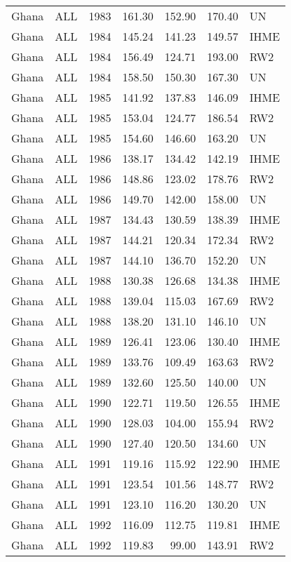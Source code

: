 \begin{longtable}{lllrrrl}
  Ghana & ALL & 1983 & 161.30 & 152.90 & 170.40 & UN \\ 
  Ghana & ALL & 1984 & 145.24 & 141.23 & 149.57 & IHME \\ 
  Ghana & ALL & 1984 & 156.49 & 124.71 & 193.00 & RW2 \\ 
  Ghana & ALL & 1984 & 158.50 & 150.30 & 167.30 & UN \\ 
  Ghana & ALL & 1985 & 141.92 & 137.83 & 146.09 & IHME \\ 
  Ghana & ALL & 1985 & 153.04 & 124.77 & 186.54 & RW2 \\ 
  Ghana & ALL & 1985 & 154.60 & 146.60 & 163.20 & UN \\ 
  Ghana & ALL & 1986 & 138.17 & 134.42 & 142.19 & IHME \\ 
  Ghana & ALL & 1986 & 148.86 & 123.02 & 178.76 & RW2 \\ 
  Ghana & ALL & 1986 & 149.70 & 142.00 & 158.00 & UN \\ 
  Ghana & ALL & 1987 & 134.43 & 130.59 & 138.39 & IHME \\ 
  Ghana & ALL & 1987 & 144.21 & 120.34 & 172.34 & RW2 \\ 
  Ghana & ALL & 1987 & 144.10 & 136.70 & 152.20 & UN \\ 
  Ghana & ALL & 1988 & 130.38 & 126.68 & 134.38 & IHME \\ 
  Ghana & ALL & 1988 & 139.04 & 115.03 & 167.69 & RW2 \\ 
  Ghana & ALL & 1988 & 138.20 & 131.10 & 146.10 & UN \\ 
  Ghana & ALL & 1989 & 126.41 & 123.06 & 130.40 & IHME \\ 
  Ghana & ALL & 1989 & 133.76 & 109.49 & 163.63 & RW2 \\ 
  Ghana & ALL & 1989 & 132.60 & 125.50 & 140.00 & UN \\ 
  Ghana & ALL & 1990 & 122.71 & 119.50 & 126.55 & IHME \\ 
  Ghana & ALL & 1990 & 128.03 & 104.00 & 155.94 & RW2 \\ 
  Ghana & ALL & 1990 & 127.40 & 120.50 & 134.60 & UN \\ 
  Ghana & ALL & 1991 & 119.16 & 115.92 & 122.90 & IHME \\ 
  Ghana & ALL & 1991 & 123.54 & 101.56 & 148.77 & RW2 \\ 
  Ghana & ALL & 1991 & 123.10 & 116.20 & 130.20 & UN \\ 
  Ghana & ALL & 1992 & 116.09 & 112.75 & 119.81 & IHME \\ 
  Ghana & ALL & 1992 & 119.83 & 99.00 & 143.91 & RW2 \\ 

\end{longtable}
